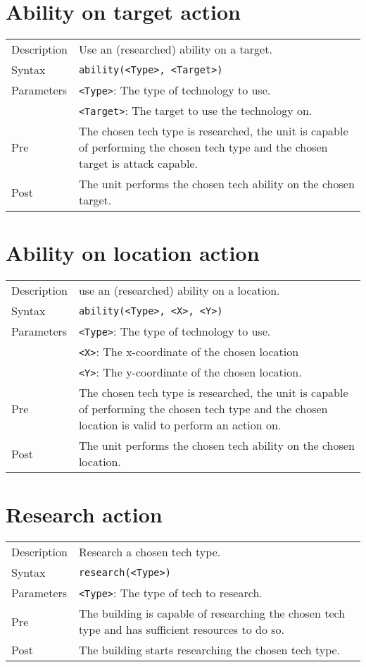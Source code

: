 \section{Ability on target action}
\begin{tabularx}{\textwidth}{lX}
 Description & Use an (researched) ability on a target. \\
 Syntax & \verb|ability(<Type>, <Target>)| \\
 Parameters & \verb|<Type>|: The type of technology to use.\\
            & \verb|<Target>|: The target to use the technology on.\\
 Pre & The chosen tech type is researched, the unit is capable of performing the chosen tech type and the chosen target is attack capable. \\
 Post & The unit performs the chosen tech ability on the chosen target.
\end{tabularx}

\section{Ability on location action}
\begin{tabularx}{\textwidth}{lX}
 Description & use an (researched) ability on a location. \\
 Syntax & \verb|ability(<Type>, <X>, <Y>)| \\
 Parameters & \verb|<Type>|: The type of technology to use.\\
            & \verb|<X>|: The x-coordinate of the chosen location \\
            & \verb|<Y>|: The y-coordinate of the chosen location. \\
 Pre & The chosen tech type is researched, the unit is capable of performing the chosen tech type and the chosen location is valid to perform an action on. \\
 Post & The unit performs the chosen tech ability on the chosen location.
\end{tabularx}

\section{Research action}
\begin{tabularx}{\textwidth}{lX}
 Description & Research a chosen tech type. \\
 Syntax & \verb|research(<Type>)| \\
 Parameters & \verb|<Type>|: The type of tech to research.\\
 Pre & The building is capable of researching the chosen tech type and has sufficient resources to do so. \\
 Post & The building starts researching the chosen tech type.
\end{tabularx}


